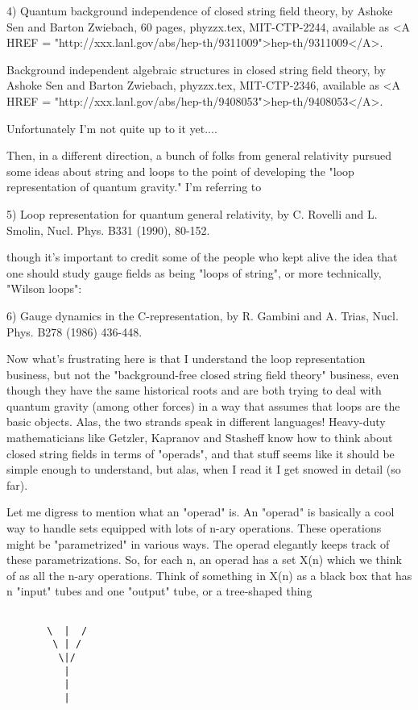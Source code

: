 4)  Quantum background independence of closed string field theory, 
by Ashoke Sen and Barton Zwiebach, 60 pages, phyzzx.tex, MIT-CTP-2244,
available as <A HREF = "http://xxx.lanl.gov/abs/hep-th/9311009">hep-th/9311009</A>.

Background independent algebraic structures in closed string field theory,
by Ashoke Sen and Barton Zwiebach, phyzzx.tex, MIT-CTP-2346, available
as <A HREF = "http://xxx.lanl.gov/abs/hep-th/9408053">hep-th/9408053</A>.  

Unfortunately I'm not quite up to it yet....

Then, in a different direction, a bunch of folks from general relativity
pursued some ideas about string and loops to the point of developing the
"loop representation of quantum gravity."  I'm referring to

5) Loop representation for quantum general relativity, by C. Rovelli
and L. Smolin, Nucl. Phys. B331 (1990), 80-152.

though it's important to credit some of the people who kept alive the idea
that one should study gauge fields as being "loops of string", or more
technically, "Wilson loops":

6) Gauge dynamics in the C-representation, by R. Gambini and A. Trias,
Nucl. Phys. B278 (1986) 436-448. 

Now what's frustrating here is that I understand the loop representation
business, but not the "background-free closed string field theory"
business, even though they have the same historical roots and are both
trying to deal with quantum gravity (among other forces) in a way that
assumes that loops are the basic objects.  Alas, the two strands speak
in different languages!  Heavy-duty mathematicians like Getzler,
Kapranov and Stasheff know how to think about closed string fields in
terms of "operads", and that stuff seems like it should be simple enough
to understand, but alas, when I read it I get snowed in detail (so far).

Let me digress to mention what an "operad" is.  An "operad" is basically
a cool way to handle sets equipped with lots of n-ary operations.  These
operations might be "parametrized" in various ways.  The operad
elegantly keeps track of these parametrizations.  So, for each n, an
operad has a set X(n) which we think of as all the n-ary operations.
Think of something in X(n) as a black box that has n "input" tubes and
one "output" tube, or a tree-shaped thing


\begin{verbatim}

       \  |  /
        \ | /
         \|/
          |
          |
          |
\end{verbatim}
    

